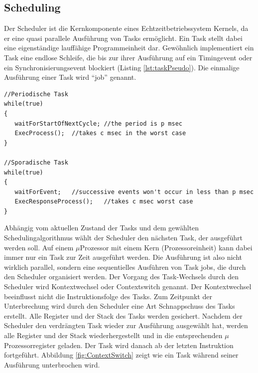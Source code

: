 \subsection{Scheduling}
\label{Scheduling}
Der Scheduler ist die Kernkomponente eines Echtzeitbetriebssystem Kernels, da er eine quasi parallele Aus\-füh\-rung von Tasks ermöglicht. Ein Task stellt dabei eine ei\-gen\-stän\-di\-ge lauffähige Programmeinheit dar. Gewöhnlich implementiert ein Task eine endlose Schleife, die bis zur ihrer Ausführung auf ein Timingevent oder ein Synchronisierungsevent blockiert (Listing \ref{lst:taskPseudo}). Die einmalige Aus\-füh\-rung einer Task wird "`job"'\cite{9780128015070} genannt. 
\begin{lstlisting}[caption={Pseudocode für die Implementierungsmuster einer periodischen (zeitgesteuert) Task und sporadischen (eventgesteuert) Task ~\protect\citeA{LorenK.Rhodes2017}}, linewidth=8cm,captionpos=b, label=lst:taskPseudo, float=hbt]
//Periodische Task
while(true)
{
   waitForStartOfNextCycle; //the period is p msec
   ExecProcess();  //takes c msec in the worst case
}

//Sporadische Task
while(true)
{
   waitForEvent;   //successive events won't occur in less than p msec
   ExecResponseProcess();   //takes c msec worst case
}
\end{lstlisting}
Abhängig vom aktuellen Zustand der Tasks und dem gewählten Scheduling\-algorithmus wählt der Scheduler den nächsten Task, der ausgeführt werden soll. Auf einem $\mu$\-Pro\-zesso\-r mit einem Kern (Prozessoreinheit) kann dabei immer nur ein Task zur Zeit ausgeführt werden. Die Ausführung ist also nicht wirklich parallel, sondern eine sequentielles Ausführen von Task jobs, die durch den Scheduler organisiert werden. Der Vorgang des Task-Wechsels durch den Scheduler wird Kontextwechsel oder Contextswitch genannt. Der Kontextwechsel beeinflusst nicht die Instruktionsfolge des Tasks. Zum Zeitpunkt der Unterbrechung wird durch den Scheduler eine Art Schnappschuss des Tasks erstellt. Alle Register und der Stack des Tasks werden gesichert. Nachdem der Scheduler den verdrängten Task wieder zur Aus\-füh\-rung ausgewählt hat, werden alle Register und der Stack wiederhergestellt und in die entsprechenden $\mu$\-Pro\-zes\-sor\-re\-gis\-ter geladen. Der Task wird danach ab der letzten Instruktion fortgeführt. Abbildung \ref{fig:ContextSwitch} zeigt wie ein Task wäh\-rend seiner Ausführung unterbrochen wird.
